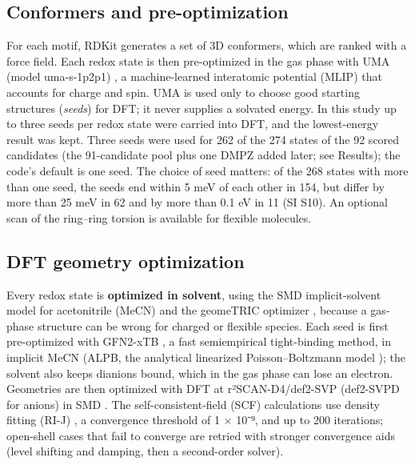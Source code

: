 \documentclass[journal=jcisd8,manuscript=article]{achemso}
\begin{document}
\subsection{Conformers and pre-optimization}

For each motif, RDKit \cite{rdkit} generates a set of 3D conformers, which are ranked with a force field. Each redox state is then pre-optimized in the gas phase with UMA (model uma-s-1p2p1) \cite{wood2025}, a machine-learned interatomic potential (MLIP) that accounts for charge and spin. UMA is used only to choose good starting structures (\emph{seeds}) for DFT; it never supplies a solvated energy. In this study up to three seeds per redox state were carried into DFT, and the lowest-energy result was kept. Three seeds were used for 262 of the 274 states of the 92 scored candidates (the 91-candidate pool plus one DMPZ added later; see Results); the code's default is one seed. The choice of seed matters: of the 268 states with more than one seed, the seeds end within 5 meV of each other in 154, but differ by more than 25 meV in 62 and by more than 0.1 eV in 11 (SI S10). An optional scan of the ring–ring torsion is available for flexible molecules.

\subsection{DFT geometry optimization}

Every redox state is \textbf{optimized in solvent}, using the SMD implicit-solvent model for acetonitrile (MeCN) \cite{marenich2009} and the geomeTRIC optimizer \cite{wang2016}, because a gas-phase structure can be wrong for charged or flexible species. Each seed is first pre-optimized with GFN2-xTB \cite{bannwarth2019}, a fast semiempirical tight-binding method, in implicit MeCN (ALPB, the analytical linearized Poisson–Boltzmann model \cite{ehlert2021}); the solvent also keeps dianions bound, which in the gas phase can lose an electron. Geometries are then optimized with DFT at r²SCAN-D4/def2-SVP (def2-SVPD for anions) in SMD \cite{furness2020,caldeweyher2019,weigend2005,rappoport2010}. The self-consistent-field (SCF) calculations use density fitting (RI-J) \cite{weigend2006}, a convergence threshold of 1 × 10⁻⁹, and up to 200 iterations; open-shell cases that fail to converge are retried with stronger convergence aids (level shifting and damping, then a second-order solver).
\end{document}
